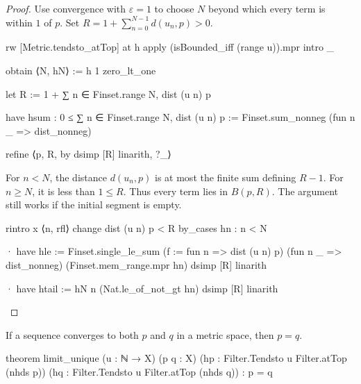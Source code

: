 \begin{proof}
  Use convergence with $\varepsilon=1$ to choose $N$ beyond which every term is within $1$ of $p$.
  Set $R=1+\sum_{n=0}^{N-1}d(u_n,p)>0$.

  \begin{lean}
    rw [Metric.tendsto_atTop] at h
    apply (isBounded_iff (range u)).mpr
    intro _

    obtain ⟨N, hN⟩ := h 1 zero_lt_one

    let R := 1 + ∑ n ∈ Finset.range N, dist (u n) p

    have hsum : 0 ≤ ∑ n ∈ Finset.range N, dist (u n) p :=
      Finset.sum_nonneg (fun n _ => dist_nonneg)

    refine ⟨p, R, by
      dsimp [R]
      linarith, ?_⟩
  \end{lean}

  For $n<N$, the distance $d(u_n,p)$ is at most the finite sum defining $R-1$.
  For $n\geq N$, it is less than $1\leq R$.
  Thus every term lies in $B(p,R)$.
  The argument still works if the initial segment is empty.

  \begin{lean}
    rintro x ⟨n, rfl⟩
    change dist (u n) p < R
    by_cases hn : n < N

    · have hle := Finset.single_le_sum (f := fun n => dist (u n) p)
        (fun n _ => dist_nonneg) (Finset.mem_range.mpr hn)
      dsimp [R]
      linarith

    · have htail := hN n (Nat.le_of_not_gt hn)
      dsimp [R]
      linarith
  \end{lean}

\end{proof}

\begin{lemma}
  \label{an1:lem:limit-unique}
  If a sequence converges to both $p$ and $q$ in a metric space, then $p=q$.

  \begin{lean}
    theorem limit_unique (u : ℕ → X) (p q : X)
        (hp : Filter.Tendsto u Filter.atTop (nhds p))
        (hq : Filter.Tendsto u Filter.atTop (nhds q)) : p = q
  \end{lean}
\end{lemma}

